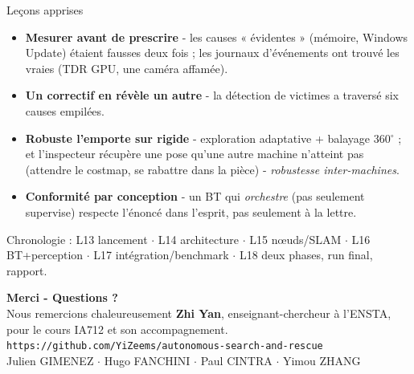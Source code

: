 \documentclass[aspectratio=169,11pt]{beamer}
\begin{document}
\begin{frame}{Leçons apprises}
  \begin{itemize}
    \item \textbf{Mesurer avant de prescrire} - les causes « évidentes » (mémoire, Windows Update) étaient fausses deux fois ; les journaux d'événements ont trouvé les vraies (TDR GPU, une caméra affamée).
    \item \textbf{Un correctif en révèle un autre} - la détection de victimes a traversé six causes empilées.
    \item \textbf{Robuste l'emporte sur rigide} - exploration adaptative + balayage 360$^\circ$ ; et l'inspecteur récupère une pose qu'une autre machine n'atteint pas (attendre le costmap, se rabattre dans la pièce) - \emph{robustesse inter-machines}.
    \item \textbf{Conformité par conception} - un BT qui \emph{orchestre} (pas seulement supervise) respecte l'énoncé dans l'esprit, pas seulement à la lettre.
  \end{itemize}
  \vfill
  {\footnotesize\color{nccblue}Chronologie : L13 lancement $\cdot$ L14 architecture $\cdot$ L15 nœuds/SLAM $\cdot$ L16 BT+perception $\cdot$ L17 intégration/benchmark $\cdot$ L18 deux phases, run final, rapport.}
\end{frame}

\begin{frame}[plain]
  \centering
  \vfill
  {\Large\color{nccblue}\textbf{Merci - Questions ?}}\\[10pt]
  {\small Nous remercions chaleureusement \textbf{Zhi Yan}, enseignant-chercheur à l'ENSTA,\\ pour le cours IA712 et son accompagnement.}\\[14pt]
  {\footnotesize \texttt{https://github.com/YiZeems/autonomous-search-and-rescue}}\\[4pt]
  {\scriptsize Julien GIMENEZ $\cdot$ Hugo FANCHINI $\cdot$ Paul CINTRA $\cdot$ Yimou ZHANG}
  \vfill
\end{frame}
\end{document}
